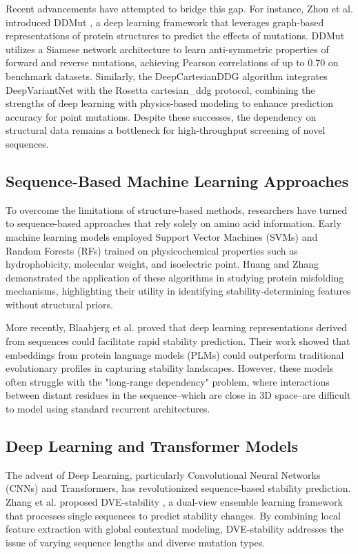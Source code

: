 \documentclass[conference]{IEEEtran}
\begin{document}
Recent advancements have attempted to bridge this gap. For instance, Zhou et al. introduced DDMut \cite{b10}, a deep learning framework that leverages graph-based representations of protein structures to predict the effects of mutations. DDMut utilizes a Siamese network architecture to learn anti-symmetric properties of forward and reverse mutations, achieving Pearson correlations of up to 0.70 on benchmark datasets. Similarly, the DeepCartesianDDG algorithm \cite{b11} integrates DeepVariantNet with the Rosetta cartesian\_ddg protocol, combining the strengths of deep learning with physics-based modeling to enhance prediction accuracy for point mutations. Despite these successes, the dependency on structural data remains a bottleneck for high-throughput screening of novel sequences.

\subsection{Sequence-Based Machine Learning Approaches}
To overcome the limitations of structure-based methods, researchers have turned to sequence-based approaches that rely solely on amino acid information. Early machine learning models employed Support Vector Machines (SVMs) and Random Forests (RFs) trained on physicochemical properties such as hydrophobicity, molecular weight, and isoelectric point. Huang and Zhang \cite{b6} demonstrated the application of these algorithms in studying protein misfolding mechanisms, highlighting their utility in identifying stability-determining features without structural priors.

More recently, Blaabjerg et al. \cite{b2} proved that deep learning representations derived from sequences could facilitate rapid stability prediction. Their work showed that embeddings from protein language models (PLMs) could outperform traditional evolutionary profiles in capturing stability landscapes. However, these models often struggle with the "long-range dependency" problem, where interactions between distant residues in the sequence–which are close in 3D space–are difficult to model using standard recurrent architectures.

\subsection{Deep Learning and Transformer Models}
The advent of Deep Learning, particularly Convolutional Neural Networks (CNNs) and Transformers, has revolutionized sequence-based stability prediction. Zhang et al. proposed DVE-stability \cite{b1}, a dual-view ensemble learning framework that processes single sequences to predict stability changes. By combining local feature extraction with global contextual modeling, DVE-stability addresses the issue of varying sequence lengths and diverse mutation types.
\end{document}
